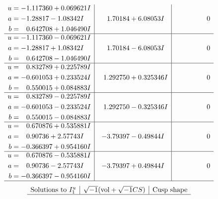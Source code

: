 \documentclass[1p]{elsarticle_modified}
\theoremstyle{definition}
\newcommand{\I}{\sqrt{-1}}
\begin{document}
$$\begin{array}{c|c|c}
\begin{aligned}
u &= -1.117360 + 0.069621 I \\
a &= -1.28817 - 1.08342 I \\
b &= \phantom{-}0.642708 + 1.046490 I\end{aligned}
 & \phantom{-}1.70184 + 6.08053 I & \phantom{-0.000000 } 0 \\ \hline\begin{aligned}
u &= -1.117360 - 0.069621 I \\
a &= -1.28817 + 1.08342 I \\
b &= \phantom{-}0.642708 - 1.046490 I\end{aligned}
 & \phantom{-}1.70184 - 6.08053 I & \phantom{-0.000000 } 0 \\ \hline\begin{aligned}
u &= \phantom{-}0.832789 + 0.225789 I \\
a &= -0.601053 + 0.233524 I \\
b &= \phantom{-}0.550015 + 0.084883 I\end{aligned}
 & \phantom{-}1.292750 + 0.325346 I & \phantom{-0.000000 } 0 \\ \hline\begin{aligned}
u &= \phantom{-}0.832789 - 0.225789 I \\
a &= -0.601053 - 0.233524 I \\
b &= \phantom{-}0.550015 - 0.084883 I\end{aligned}
 & \phantom{-}1.292750 - 0.325346 I & \phantom{-0.000000 } 0 \\ \hline\begin{aligned}
u &= \phantom{-}0.670876 + 0.535881 I \\
a &= \phantom{-}0.90736 + 2.57743 I \\
b &= -0.366397 + 0.954160 I\end{aligned}
 & -3.79397 - 0.49844 I & \phantom{-0.000000 } 0 \\ \hline\begin{aligned}
u &= \phantom{-}0.670876 - 0.535881 I \\
a &= \phantom{-}0.90736 - 2.57743 I \\
b &= -0.366397 - 0.954160 I\end{aligned}
 & -3.79397 + 0.49844 I & \phantom{-0.000000 } 0\\
 \hline 
 \end{array}$$\newpage$$\begin{array}{c|c|c}  
\text{Solutions to }I^u_{1}& \I (\text{vol} + \sqrt{-1}CS) & \text{Cusp shape}\\
 \hline 

\end{array}$$
\end{document}
